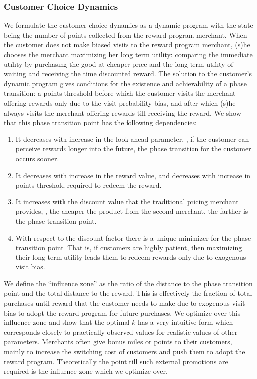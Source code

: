 \subsubsection{Customer Choice Dynamics}
We formulate the customer choice dynamics as a dynamic program with the state being the number of points collected from the reward program merchant.
When the customer does not make biased visits to the reward program merchant, (s)he chooses the merchant maximizing her long term utility: comparing the immediate utility by purchasing the good at cheaper price and the long term utility of waiting and receiving the time discounted reward.
The solution to the customer's dynamic program gives conditions for the existence and achievability of a phase transition: a points threshold before which the customer visits the merchant offering rewards only due to the visit probability bias, and after which (s)he always visits the merchant offering rewards till receiving the reward.
We show that this phase transition point has the following dependencies:
\begin{enumerate}
\item It decreases with increase in the look-ahead parameter, \ie, if the customer can perceive rewards longer into the future, the phase transition for the customer occurs sooner.
\item It decreases with increase in the reward value, and decreases with increase in points threshold required to redeem the reward. 
\item It increases with the discount value that the traditional pricing merchant provides, \ie, the cheaper the product from the second merchant, the farther is the phase transition point. 
\item With respect to the discount factor there is a unique minimizer for the phase transition point. That is, if customers are highly patient, then maximizing their long term utility leads them to redeem rewards only due to exogenous visit bias.
\end{enumerate}

We define the ``influence zone'' as the ratio of the distance to the phase transition  point and the total distance to the reward.
This is effectively the fraction of total purchases until reward that the customer needs to make due to exogenous visit bias to adopt the reward program for future purchases.
We optimize over this influence zone and show that the optimal $k$ has a very intuitive form which corresponds closely to practically observed values for realistic values of other parameters.
Merchants often give bonus miles or points to their customers, mainly to increase the switching cost of customers and push them to adopt the reward program.
Theoretically the point till such external promotions are required is the influence zone which we optimize over.

